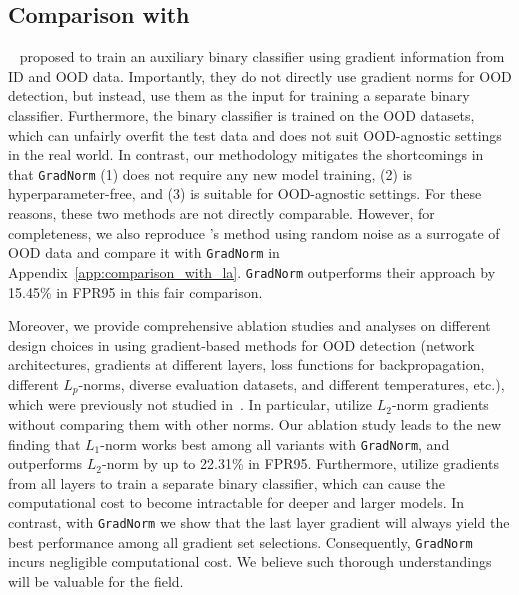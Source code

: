 \documentclass{article}
\begin{document}
\vspace{-0.2cm}
\subsection{Comparison with \citeauthor{lee2020gradients}}
\label{sec:connection_with_al}
\vspace{-0.1cm}
\citeauthor{lee2020gradients}~\cite{lee2020gradients} proposed to train an auxiliary binary classifier using gradient information from ID and OOD data. Importantly, they do not directly use gradient norms for OOD detection, but instead, use them as the input for training a separate binary classifier. Furthermore, the binary classifier is trained on the OOD datasets, which can unfairly overfit the test data and does not suit OOD-agnostic settings in the real world. In contrast, our methodology mitigates the shortcomings in that \texttt{GradNorm} (1) does not require any new model training, (2) is hyperparameter-free, and (3) is suitable for OOD-agnostic settings. For these reasons, these two methods are not directly comparable. However, for completeness, we also reproduce \citeauthor{lee2020gradients}'s method using random noise as a surrogate of OOD data and compare it with \texttt{GradNorm} in Appendix~\ref{app:comparison_with_la}. \texttt{GradNorm} outperforms their approach by 15.45\% in FPR95 in this fair comparison.

Moreover, we provide comprehensive ablation studies and analyses on different design choices in using gradient-based methods for OOD detection (network architectures, gradients at different layers, loss functions for backpropagation, different $L_p$-norms, diverse evaluation datasets, and different temperatures, etc.), which were previously not studied in~\cite{lee2020gradients}. In particular, \citeauthor{lee2020gradients} utilize $L_2$-norm gradients without comparing them with other norms. Our ablation study leads to the new finding that $L_1$-norm works best among all variants with \texttt{GradNorm}, and outperforms $L_2$-norm by up to 22.31\% in FPR95. Furthermore, \citeauthor{lee2020gradients} utilize gradients from all layers to train a separate binary classifier, which can cause the computational cost to become intractable for deeper and larger models. In contrast, with \texttt{GradNorm} we show that the last layer gradient will always yield the best performance among all gradient set selections. Consequently, \texttt{GradNorm} incurs negligible computational cost. We believe such thorough understandings will be valuable for the field.
\end{document}
